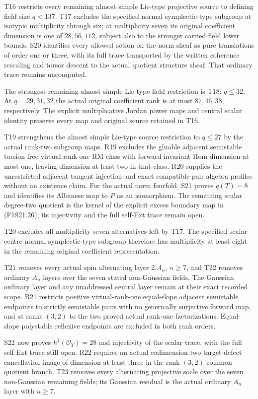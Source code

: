 T16 restricts every remaining almost simple Lie-type projective source
to defining field size $q<137$. T17 excludes the specified normal
symplectic-type subgroup at isotypic multiplicity through six; at
multiplicity seven its original coefficient dimension is one of
$28,56,112$, subject also to the stronger carried field lower bounds.
S20 identifies every allowed action on the norm sheaf as pure
translations of order one or three, with its full trace transported by
the written coherence rescaling and torsor descent to the actual
quotient structure sheaf. That ordinary trace remains uncomputed.


The strongest remaining almost simple Lie-type field restriction is
T18: $q\le32$. At $q=29,31,32$ the actual original coefficient rank
is at most $87,46,38$, respectively. The explicit multiplicative
Jordan power maps and central scalar identity preserve every map
and original source retained in T16.


T19 strengthens the almost simple Lie-type source restriction to
$q\le27$ by the actual rank-two subgroup maps. R19 excludes the
gluable adjacent semistable torsion-free virtual-rank-one RM class
with forward invariant Hom dimension at most one, leaving dimension
at least two in that class. R20 supplies the unrestricted adjacent
tangent injection and exact compatible-pair algebra profiles without
an existence claim. For the actual norm fourfold, S21 proves
$q(T)=8$ and identifies its Albanese map to $P$ as an isomorphism.
The remaining scalar degree-two quotient is the kernel of the
explicit excess boundary map in (F1S21.26); its injectivity and the
full self-Ext trace remain open.


T20 excludes all multiplicity-seven alternatives left by T17. The specified scalar-centre normal symplectic-type subgroup therefore has multiplicity at least eight in the remaining original coefficient representation.


T21 removes every actual spin alternating layer $2.A_n$, $n\ge7$, and T22 removes ordinary $A_n$ layers over the seven stated non-Gaussian fields. The Gaussian ordinary layer and any unaddressed central layer remain at their exact recorded scope. R21 restricts positive virtual-rank-one equal-slope adjacent semistable endpoints to strictly semistable pairs with no generically surjective forward map, and at ranks $(3,2)$ to the two proved actual rank-one factorizations. Equal-slope polystable reflexive endpoints are excluded in both rank orders.


S22 now proves $h^2(\mathcal O_Y)=28$ and injectivity of the scalar trace, with the full self-Ext trace still open. R22 requires an actual codimension-two target-defect cancellation image of dimension at least three in the rank $(3,2)$ common-quotient branch. T23 removes every alternating projective socle over the seven non-Gaussian remaining fields; its Gaussian residual is the actual ordinary $A_n$ layer with $n\ge7$.


